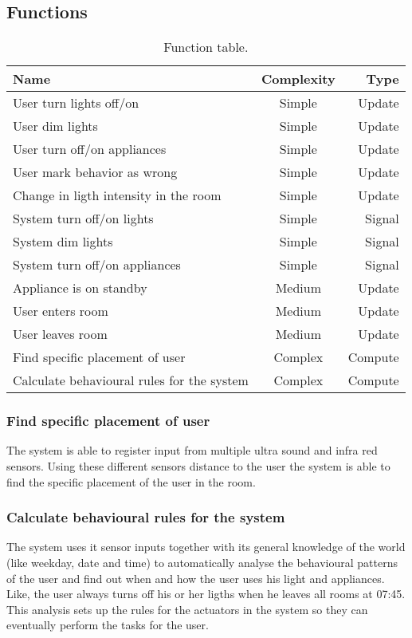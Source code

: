 \subsection{Functions}
\begin{table}[hbtp]
\centering
\begin{tabular}{lcr}
\toprule
\textbf{Name}																& \textbf{Complexity}	& \textbf{Type} \\
\midrule
User turn lights off/on  		 					   		& Simple								& Update  \\
User dim lights 	    	     					  		& Simple								& Update  \\
User turn off/on appliances 						 		& Simple								& Update  \\
User mark behavior as wrong							 		& Simple								& Update  \\
Change in ligth intensity in the room				& Simple								& Update  \\
System turn off/on lights    								& Simple								& Signal  \\
System dim lights    		      					 		& Simple								& Signal  \\
System turn off/on appliances								& Simple								& Signal  \\
Appliance is on standby										 	& Medium								& Update  \\
User enters room													 	& Medium								& Update  \\
User leaves room													 	& Medium								& Update  \\
Find specific placement of user							& Complex								& Compute \\
Calculate behavioural rules for the system	& Complex								& Compute \\
\bottomrule
\end{tabular}
\caption{Function table.}
\label{table:functionlist}
\end{table}

\subsubsection{Find specific placement of user}
The system is able to register input from multiple ultra sound and infra red sensors. Using these different sensors distance to the user the system is able to find the specific placement of the user in the room.

\subsubsection{Calculate behavioural rules for the system}
The system uses it sensor inputs together with its general knowledge of the world (like weekday, date and time) to automatically analyse the behavioural patterns of the user and find out when and how the user uses his light and appliances. Like, the user always turns off his or her ligths when he leaves all rooms at 07:45. This analysis sets up the rules for the actuators in the system so they can eventually perform the tasks for the user.